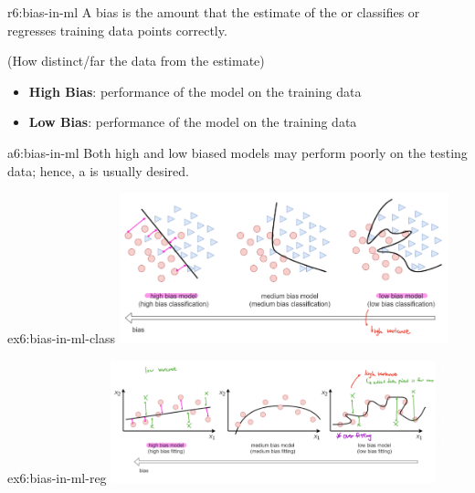 \documentclass{tron}
\begin{document}
\begin{remark}{r6:bias-in-ml}
	A bias is the amount that the estimate of the  or  classifies or regresses training data points correctly.
	
	(How distinct/far the data from the estimate)
	
	\begin{itemize}
		\item \textbf{High Bias}:  performance of the model on the training data
		\item \textbf{Low Bias}:  performance of the model on the training data
	\end{itemize}
	
	\begin{alert}[]{a6:bias-in-ml}
		Both high and low biased models may perform poorly on the testing data; hence, a  is usually desired.
	\end{alert}

	\begin{example}{ex6:bias-in-ml-class}
		\includegraphics[width=360px]{Figs/Lec6/bias-class}
	\end{example}

	\begin{example}{ex6:bias-in-ml-reg}
		\includegraphics[width=360px]{Figs/Lec6/bias-reg}
	\end{example}	
\end{remark}

\clearpage
\end{document}
